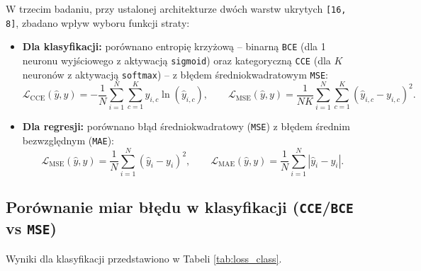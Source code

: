 \documentclass{article}
\begin{document}
W trzecim badaniu, przy ustalonej architekturze dwóch warstw ukrytych \texttt{[16, 8]}, zbadano wpływ wyboru funkcji straty:
\begin{itemize}
    \item \textbf{Dla klasyfikacji:} porównano entropię krzyżową -- binarną \texttt{BCE} (dla 1 neuronu wyjściowego z aktywacją \texttt{sigmoid}) oraz kategoryczną \texttt{CCE} (dla $K$ neuronów z aktywacją \texttt{softmax}) -- z błędem średniokwadratowym \texttt{MSE}:
    \begin{equation}
        \mathcal{L}_{\text{CCE}}(\hat{y}, y) = -\frac{1}{N} \sum_{i=1}^N \sum_{c=1}^K y_{i,c} \ln(\hat{y}_{i,c}), \qquad
        \mathcal{L}_{\text{MSE}}(\hat{y}, y) = \frac{1}{NK} \sum_{i=1}^N \sum_{c=1}^K (\hat{y}_{i,c} - y_{i,c})^2.
    \end{equation}
    \item \textbf{Dla regresji:} porównano błąd średniokwadratowy (\texttt{MSE}) z błędem średnim bezwzględnym (\texttt{MAE}):
    \begin{equation}
        \mathcal{L}_{\text{MSE}}(\hat{y}, y) = \frac{1}{N} \sum_{i=1}^N (\hat{y}_i - y_i)^2, \qquad
        \mathcal{L}_{\text{MAE}}(\hat{y}, y) = \frac{1}{N} \sum_{i=1}^N |\hat{y}_i - y_i|.
    \end{equation}
\end{itemize}

\subsection{Porównanie miar błędu w klasyfikacji (\texttt{CCE}/\texttt{BCE} vs \texttt{MSE})}

Wyniki dla klasyfikacji przedstawiono w Tabeli \ref{tab:loss_class}.
\end{document}
